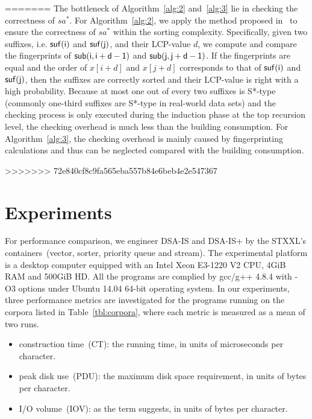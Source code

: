 \documentclass[10pt,journal,compsoc]{IEEEtran}
\begin{document}
=======
The bottleneck of Algorithm~\ref{alg:2} and~\ref{alg:3} lie in checking the correctness of $sa^*$. For Algorithm~\ref{alg:2}, we apply the method proposed in~\cite{wu2017} to ensure the correctness of $sa^*$ within the sorting complexity. Specifically, given two suffixes, i.e. $\sf suf(i)$ and $\sf suf(j)$, and their LCP-value $d$, we compute and compare the fingerprints of $\sf sub(i, i + d - 1)$ and $\sf sub(j, j + d - 1)$. If the fingerprints are equal and the order of $x[i + d]$ and $x[j + d]$ corresponds to that of $\sf suf(i)$ and $\sf suf(j)$, then the suffixes are correctly sorted and their LCP-value is right with a high probability. Because at most one out of every two suffixes is S*-type (commonly one-third suffixes are S*-type in real-world data sets) and the checking process is only executed during the induction phase at the top recursion level, the checking overhead is much less than the building consumption. For Algorithm~\ref{alg:3}, the checking overhead is mainly caused by fingerprinting calculations and thus can be neglected compared with the building consumption.

>>>>>>> 72e840cf8c9fa565eba557b84e6beb4e2e547367
\section{Experiments} \label{sec:experiments}

For performance comparison, we engineer DSA-IS and DSA-IS+ by the STXXL's containers~(vector, sorter, priority queue and stream). The experimental platform is a desktop computer equipped with an Intel Xeon E3-1220 V2 CPU, 4GiB RAM and 500GiB HD. All the programs are complied by gcc/g++ 4.8.4 with -O3 options under Ubuntu 14.04 64-bit operating system. In our experiments, three performance metrics are investigated for the programs running on the corpora listed in Table~\ref{tbl:corpora}, where each metric is measured as a mean of two runs.

\begin{itemize}
	\item construction time~(CT): the running time, in units of microseconds per character.
	\item peak disk use~(PDU): the maximum disk space requirement, in units of bytes per character.
	\item I/O volume~(IOV): as the term suggests, in units of bytes per character.
\end{itemize}
\end{document}
